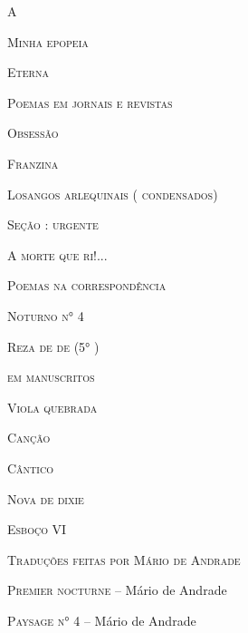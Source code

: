 \textsc{A }

\textsc{Minha epopeia}

\textsc{Eterna }

\textsc{Poemas em jornais e revistas}

\textsc{Obsessão}

\textsc{Franzina}

\textsc{Losangos arlequinais ( condensados)}

\textsc{Seção : urgente}

\textsc{A morte que ri!...}

\textsc{Poemas na correspondência}

\textsc{Noturno n° 4}

\textsc{Reza de de} \textsc{(5° )}

\textsc{em manuscritos}

\textsc{Viola quebrada}

\textsc{Canção }

\textsc{Cântico}

\textsc{Nova de dixie}

\textsc{Esboço VI}

\textsc{Traduções feitas por Mário de Andrade}

\textsc{Premier nocturne} -- Mário de Andrade

\textsc{Paysage n° 4} -- Mário de Andrade
